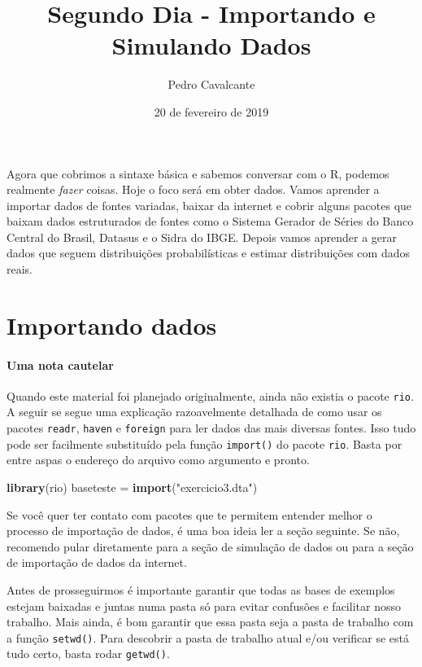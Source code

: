\documentclass[]{article}
\title{Segundo Dia - Importando e Simulando Dados}
\author{Pedro Cavalcante}
\date{20 de fevereiro de 2019}
\newenvironment{Shaded}{\begin{snugshade}}{\end{snugshade}}
\newcommand{\KeywordTok}[1]{\textcolor[rgb]{0.13,0.29,0.53}{\textbf{#1}}}
\newcommand{\StringTok}[1]{\textcolor[rgb]{0.31,0.60,0.02}{#1}}
\newcommand{\NormalTok}[1]{#1}
\let\oldparagraph\paragraph
\renewcommand{\paragraph}[1]{\oldparagraph{#1}\mbox{}}
\begin{document}
\maketitle

Agora que cobrimos a sintaxe básica e sabemos conversar com o R, podemos
realmente \emph{fazer} coisas. Hoje o foco será em obter dados. Vamos
aprender a importar dados de fontes variadas, baixar da internet e
cobrir alguns pacotes que baixam dados estruturados de fontes como o
Sistema Gerador de Séries do Banco Central do Brasil, Datasus e o Sidra
do IBGE. Depois vamos aprender a gerar dados que seguem distribuições
probabilísticas e estimar distribuições com dados reais.

\section{Importando dados}\label{importando-dados}

\paragraph{Uma nota cautelar}\label{uma-nota-cautelar}

Quando este material foi planejado originalmente, ainda não existia o
pacote \texttt{rio}. A seguir se segue uma explicação razoavelmente
detalhada de como usar os pacotes \texttt{readr}, \texttt{haven} e
\texttt{foreign} para ler dados das mais diversas fontes. Isso tudo pode
ser facilmente substituído pela função \texttt{import()} do pacote
\texttt{rio}. Basta por entre aspas o endereço do arquivo como argumento
e pronto.

\begin{Shaded}
\begin{Highlighting}[]
\KeywordTok{library}\NormalTok{(rio)}
\NormalTok{baseteste =}\StringTok{ }\KeywordTok{import}\NormalTok{(}\StringTok{"exercicio3.dta"}\NormalTok{)}
\end{Highlighting}
\end{Shaded}

Se você quer ter contato com pacotes que te permitem entender melhor o
processo de importação de dados, é uma boa ideia ler a seção seguinte.
Se não, recomendo pular diretamente para a seção de simulação de dados
ou para a seção de importação de dados da internet.

Antes de prosseguirmos é importante garantir que todas as bases de
exemplos estejam baixadas e juntas numa pasta só para evitar confusões e
facilitar nosso trabalho. Mais ainda, é bom garantir que essa pasta seja
a pasta de trabalho com a função \texttt{setwd()}. Para descobrir a
pasta de trabalho atual e/ou verificar se está tudo certo, basta rodar
\texttt{getwd()}.
\end{document}
